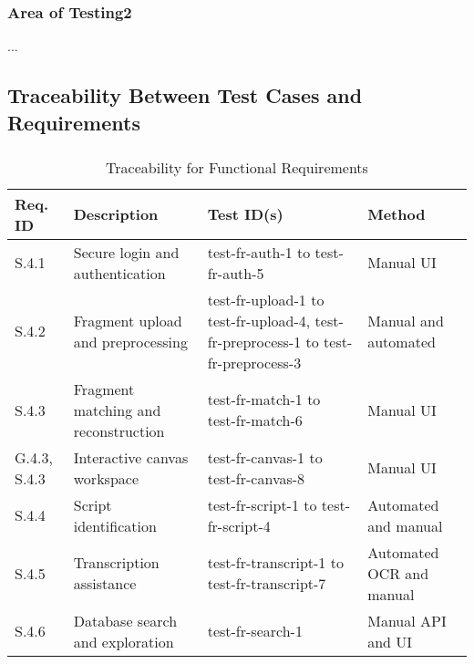 \documentclass[12pt, titlepage]{article}
\begin{document}
\subsubsection{Area of Testing2}

...

\subsection{Traceability Between Test Cases and Requirements}

\subsubsection{}

\begin{table}[ht]
\centering
\begin{tabular}{|p{2cm}|p{4cm}|p{4cm}|p{2.5cm}|}
\hline
\textbf{Req. ID} & \textbf{Description} & \textbf{Test ID(s)} & \textbf{Method} \\
\hline
S.4.1 & Secure login and authentication & test-fr-auth-1 to test-fr-auth-5 & Manual UI \\
\hline
S.4.2 & Fragment upload and preprocessing & test-fr-upload-1 to test-fr-upload-4, test-fr-preprocess-1 to test-fr-preprocess-3 & Manual and automated \\
\hline
S.4.3 & Fragment matching and reconstruction & test-fr-match-1 to test-fr-match-6 & Manual UI \\
\hline
G.4.3, S.4.3 & Interactive canvas workspace & test-fr-canvas-1 to test-fr-canvas-8 & Manual UI \\
\hline
S.4.4 & Script identification & test-fr-script-1 to test-fr-script-4 & Automated and manual \\
\hline
S.4.5 & Transcription assistance & test-fr-transcript-1 to test-fr-transcript-7 & Automated OCR and manual \\
\hline
S.4.6 & Database search and exploration & test-fr-search-1 & Manual API and UI \\
\hline
\end{tabular}
\caption{Traceability for Functional Requirements}
\end{table}

\end{document}

